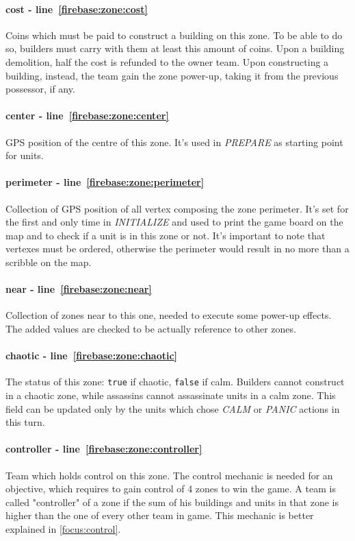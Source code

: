 				\paragraph{cost - line~\ref{firebase:zone:cost}}
				Coins which must be paid to construct a building on this zone. To be able to do so, builders must carry with them at least this amount of coins. Upon a building demolition, half the cost is refunded to the owner team. Upon constructing a building, instead, the team gain the zone power-up, taking it from the previous possessor, if any.
				
				\paragraph{center - line~\ref{firebase:zone:center}}
				GPS position of the centre of this zone. It's used in \emph{PREPARE} as starting point for units.
				
				\paragraph{perimeter - line~\ref{firebase:zone:perimeter}}
				Collection of GPS position of all vertex composing the zone perimeter. It's set for the first and only time in \emph{INITIALIZE} and used to print the game board on the map and to check if a unit is in this zone or not. It's important to note that vertexes must be ordered, otherwise the perimeter would result in no more than a scribble on the map.
				
				\paragraph{near - line~\ref{firebase:zone:near}}
				Collection of zones near to this one, needed to execute some power-up effects.
				The added values are checked to be actually reference to other zones.
				
				\paragraph{chaotic - line~\ref{firebase:zone:chaotic}}
				The status of this zone: \lstinline|true| if chaotic, \lstinline|false| if calm. Builders cannot construct in a chaotic zone, while assassins cannot assassinate units in a calm zone. This field can be updated only by the units which chose \emph{CALM} or \emph{PANIC} actions in this turn.
				
				\paragraph{controller - line~\ref{firebase:zone:controller}}
				Team which holds control on this zone. The control mechanic is needed for an objective, which requires to gain control of 4 zones to win the game. A team is called "controller" of a zone if the sum of his buildings and units in that zone is higher than the one of every other team in game. This mechanic is better explained in \autoref{focus:control}.
				
